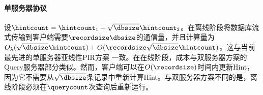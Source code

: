 \paragraph{单服务器协议}
设$\hintcount = \hintcount_1 + \sqrt{\dbsize}\hintcount_2$。在离线阶段将数据库流式传输到客户端需要$\recordsize\dbsize$的通信量，并且计算量为$O_\lambda(\sqrt{\dbsize}\hintcount) + O(\recordsize\sqrt{\dbsize}\hintcount)$。这与当前最先进的单服务器亚线性PIR方案 \cite{Piano} 一致。在在线阶段，成本与双服务器方案的Query服务器部分类似。然而，客户端可以在$O(\recordsize)$时间内更新Hint，因为它不需要从$\sqrt{\dbsize}$条记录中重新计算Hint。与双服务器方案不同的是，离线阶段必须在$\querycount$次查询后重新运行。